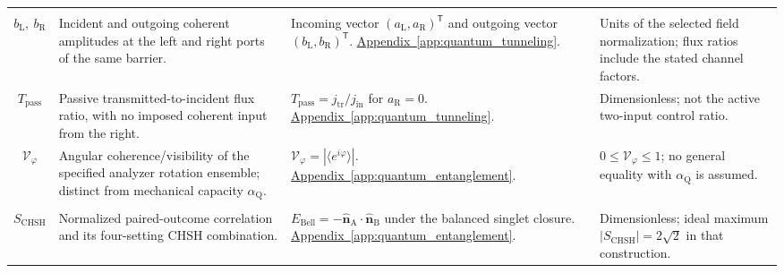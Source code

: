 \begin{longtable}{@{} c p{5.5cm} p{4cm} p{3.5cm} @{}}
\begin{tabular}[c]{@{}c@{}}$a_{\mathrm L},\ a_{\mathrm R}$ \\ $b_{\mathrm L},\ b_{\mathrm R}$\end{tabular} & {\raggedright Incident and outgoing coherent amplitudes at the left and right ports of the same barrier.\par} & {\raggedright Incoming vector $(a_{\mathrm L},a_{\mathrm R})^{\mathsf T}$ and outgoing vector $(b_{\mathrm L},b_{\mathrm R})^{\mathsf T}$. \newline \hyperref[app:quantum_tunneling]{Appendix~\ref*{app:quantum_tunneling}}.\par} & {\raggedright Units of the selected field normalization; flux ratios include the stated channel factors.\par} \\

$T_{\mathrm{pass}}$ & {\raggedright Passive transmitted-to-incident flux ratio, with no imposed coherent input from the right.\par} & {\raggedright $T_{\mathrm{pass}}=j_{\mathrm{tr}}/j_{\mathrm{in}}$ for $a_{\mathrm R}=0$. \newline \hyperref[app:quantum_tunneling]{Appendix~\ref*{app:quantum_tunneling}}.\par} & {\raggedright Dimensionless; not the active two-input control ratio.\par} \\

$\mathcal V_\varphi$ & {\raggedright Angular coherence/visibility of the specified analyzer rotation ensemble; distinct from mechanical capacity $\alpha_{\mathrm Q}$.\par} & {\raggedright $\mathcal V_\varphi=|\langle e^{i\varphi}\rangle|$. \newline \hyperref[app:quantum_entanglement]{Appendix~\ref*{app:quantum_entanglement}}.\par} & {\raggedright $0\leq\mathcal V_\varphi\leq1$; no general equality with $\alpha_{\mathrm Q}$ is assumed.\par} \\

\begin{tabular}[c]{@{}c@{}}$E_{\mathrm{Bell}}$ \\ $S_{\mathrm{CHSH}}$\end{tabular} & {\raggedright Normalized paired-outcome correlation and its four-setting CHSH combination.\par} & {\raggedright $E_{\mathrm{Bell}}=-\widehat{\mathbf n}_{\mathrm A}\cdot\widehat{\mathbf n}_{\mathrm B}$ under the balanced singlet closure. \newline \hyperref[app:quantum_entanglement]{Appendix~\ref*{app:quantum_entanglement}}.\par} & {\raggedright Dimensionless; ideal maximum $|S_{\mathrm{CHSH}}|=2\sqrt2$ in that construction.\par} \\


\end{longtable}
